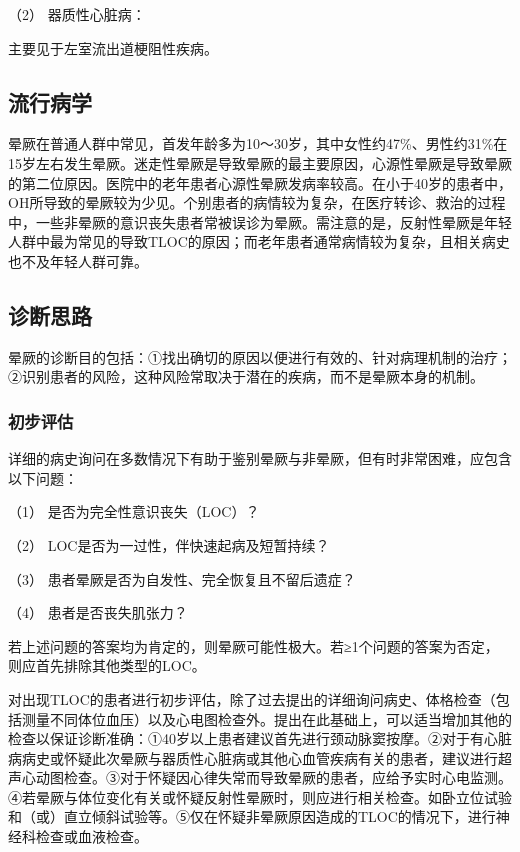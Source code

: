 \hypertarget{text00014.htmlux5cux23CHP1-4-1-3-2}{}
（2） 器质性心脏病：

主要见于左室流出道梗阻性疾病。

\subsection{流行病学}

晕厥在普通人群中常见，首发年龄多为10～30岁，其中女性约47\%、男性约31\%在15岁左右发生晕厥。迷走性晕厥是导致晕厥的最主要原因，心源性晕厥是导致晕厥的第二位原因。医院中的老年患者心源性晕厥发病率较高。在小于40岁的患者中，OH所导致的晕厥较为少见。个别患者的病情较为复杂，在医疗转诊、救治的过程中，一些非晕厥的意识丧失患者常被误诊为晕厥。需注意的是，反射性晕厥是年轻人群中最为常见的导致TLOC的原因；而老年患者通常病情较为复杂，且相关病史也不及年轻人群可靠。

\subsection{诊断思路}

晕厥的诊断目的包括：①找出确切的原因以便进行有效的、针对病理机制的治疗；②识别患者的风险，这种风险常取决于潜在的疾病，而不是晕厥本身的机制。

\subsubsection{初步评估}

详细的病史询问在多数情况下有助于鉴别晕厥与非晕厥，但有时非常困难，应包含以下问题：

（1） 是否为完全性意识丧失（LOC）？

（2） LOC是否为一过性，伴快速起病及短暂持续？

（3） 患者晕厥是否为自发性、完全恢复且不留后遗症？

（4） 患者是否丧失肌张力？

若上述问题的答案均为肯定的，则晕厥可能性极大。若≥1个问题的答案为否定，则应首先排除其他类型的LOC。

对出现TLOC的患者进行初步评估，除了过去提出的详细询问病史、体格检查（包括测量不同体位血压）以及心电图检查外。提出在此基础上，可以适当增加其他的检查以保证诊断准确：①40岁以上患者建议首先进行颈动脉窦按摩。②对于有心脏病病史或怀疑此次晕厥与器质性心脏病或其他心血管疾病有关的患者，建议进行超声心动图检查。③对于怀疑因心律失常而导致晕厥的患者，应给予实时心电监测。④若晕厥与体位变化有关或怀疑反射性晕厥时，则应进行相关检查。如卧立位试验和（或）直立倾斜试验等。⑤仅在怀疑非晕厥原因造成的TLOC的情况下，进行神经科检查或血液检查。

